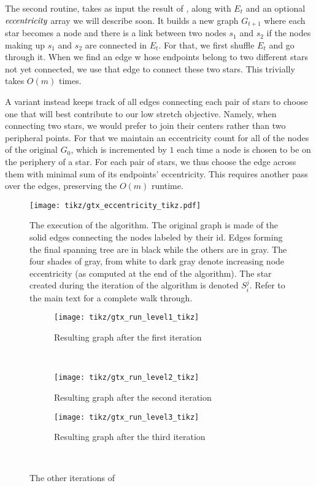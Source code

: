 \bigskip

The second routine, \collapseStar{} takes as input the result of \extractStar{}, along with $E_t$
and an optional $\emph{eccentricity}$ array we will describe soon. It builds a new graph $G_{t+1}$
where each star becomes a node and there is a link between two nodes $s_1$ and $s_2$ if the nodes
making up $s_1$ and $s_2$ are connected in $E_t$. For that, we first shuffle $E_t$ and go through
it. When we  find an edge w hose endpoints belong to two different stars not yet connected, we use
that edge to connect these two stars. This trivially takes $O(m)$ times.

A variant instead keeps track of all edges connecting each pair of stars to choose one that will
best contribute to our low stretch objective. Namely, when connecting two stars, we would prefer to
join their centers rather than two peripheral points. For that we maintain an eccentricity count for
all of the nodes of the original $G_0$, which is incremented by $1$ each time a node is chosen to be
on the periphery of a star.
For each pair of stars, we thus choose the edge across them with minimal sum of its endpoints'
eccentricity. This requires another pass over the edges, preserving the $O(m)$ runtime.

\begin{figure}[htbp]
  \centering
  \texttt{[image: tikz/gtx\_eccentricity\_tikz.pdf]}
  \caption[The hierarchical structure of stars created by \gtx{}]{%
    The execution of the \gtx{} algorithm. The original graph is made of the solid edges
    connecting the nodes labeled by their id. Edges forming the final spanning tree are in black
    while the others are in gray. The four shades of gray, from white to dark gray
    denote increasing node eccentricity (as computed at the end of the algorithm). The \ith{} star
    created during the \jth{} iteration of the algorithm is denoted $S_i^j$. Refer to the main text
    for a complete walk through.}
  \label{fig:gtx_eccentricity}
\end{figure}

\begin{figure}[bthp]
  \centering
  \begin{subfigure}[b]{0.47\textwidth}
    \centering
    \texttt{[image: tikz/gtx\_run\_level1\_tikz]}
    \caption{Resulting graph after the first iteration}\label{fig:gtx_run1}
  \end{subfigure}~
  \begin{subfigure}[b]{0.47\textwidth}
    \centering
    \texttt{[image: tikz/gtx\_run\_level2\_tikz]}
    \caption{Resulting graph after the second iteration}\label{fig:gtx_run2}
    \vspace{\baselineskip}
    \texttt{[image: tikz/gtx\_run\_level3\_tikz]}
    \caption{Resulting graph after the third iteration}\label{fig:gtx_run3}
  \end{subfigure}~
  \caption{The other iterations of \gtx{}}\label{fig:gtx_run}
\end{figure}

